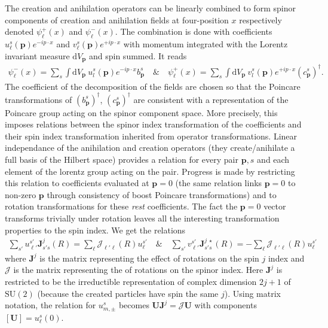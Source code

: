 \documentclass[10pt, a4paper]{article}
\begin{document}
The creation and anihilation operators can be linearly combined to form spinor components of creation and anihilation fields at four-position $x$ respectively denoted $\psi^{+}_\ell(x)$ and $\psi^{-}_\ell(x)$. The combination is done with coefficients $u_\ell^s(\mathbf{p}) e^{-i p \cdot x}$ and $v_\ell^s(\mathbf{p}) e^{+i p \cdot x}$ with momentum integrated with the Lorentz invariant measure $\text{d}V_\mathbf{p}$ and spin summed. It reads 
\begin{align*}
  \psi^{-}_\ell(x) = \sum_s \int \text{d}V_\mathbf{p} \ u_l^s(\mathbf{p}) e^{-i p \cdot x} b_\mathbf{p}^s  \quad \&\quad \psi^{+}_\ell(x) = \sum_s \int \text{d}V_\mathbf{p} \ v_l^s(\mathbf{p}) e^{+i p \cdot x} (c_\mathbf{p}^s)^\dagger.
\end{align*}
The coefficient of the decomposition of the fields are chosen so that the Poincare transformations of $(b_\mathbf{p}^s)^\dagger$, $(c_\mathbf{p}^s)^\dagger$ are consistent with a representation of the Poincare group acting on the spinor component space. More precisely, this imposes relations between the spinor index transformation of the coefficients and their spin index transformation inherited from operator transformations. Linear independance of the anihilation and creation operators (they create/anihilate a full basis of the Hilbert space) provides a relation for every pair $\mathbf{p}, s$ and each element of the lorentz group acting on the pair. Progress is made by restricting this relation to coefficients evaluated at $\mathbf{p} = 0$ (the same relation links $\mathbf{p} = 0$ to non-zero $\mathbf{p}$ through consistency of boost Poincare transformations) and to rotation transformations for these \textit{rest} coefficients. The fact the $\mathbf{p}=0$ vector transforms trivially under rotation leaves all the interesting transformation properties to the spin index. We get the relations 
\begin{align*}
  \sum_{s'} u_{\ell'}^{s'} \mathbf{J}_{s's}^{j} (R) = \sum_{\ell} \mathcal{J}_{\ell'\ell} (R) u_{\ell}^{s'}\quad \& \quad \sum_{s'} v_{\ell'}^{s'} \mathbf{J}_{s's}^{j\ \star} (R) = -\sum_{\ell} \mathcal{J}_{\ell'\ell} (R) u_{\ell}^{s'}
\end{align*}
where $\mathbf{J}^{j}$ is the matrix representing the effect of rotations on the spin $j$ index and $\mathcal{J}$ is the matrix representing the of rotations on the spinor index.  Here $\mathbf{J}^j$ is restricted to be the irreductible representation of complex dimension $2j+1$ of $\text{SU}(2)$ (because the created particles have spin the same $j$). Using matrix notation, the relation for $u_{m, \pm}^{s}$ becomes 
$
  \mathbf{U}\mathbf{J}^{j} = \mathcal{J}\mathbf{U}
$
with components $[\mathbf{U}] = u_\ell^s(0)$. 
\end{document}
